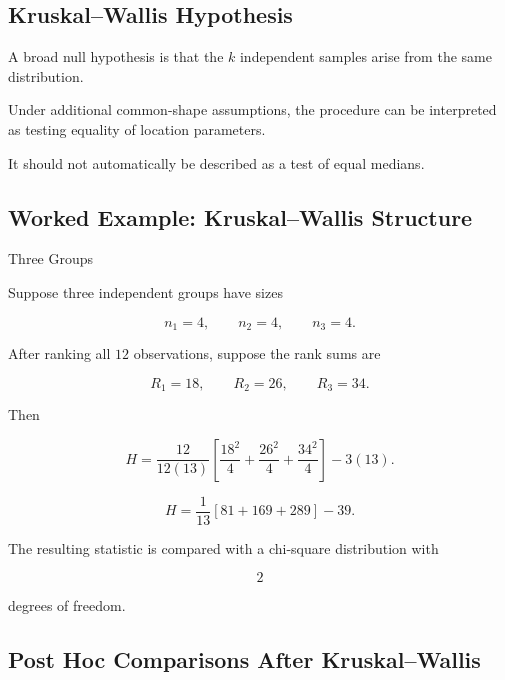 \subsection{Kruskal--Wallis Hypothesis}
\label{subsec:kruskal-wallis-hypothesis}

A broad null hypothesis is that the \(k\) independent samples arise from
the same distribution.

Under additional common-shape assumptions, the procedure can be
interpreted as testing equality of location parameters.

It should not automatically be described as a test of equal medians.

\subsection{Worked Example: Kruskal--Wallis Structure}
\label{subsec:worked-kruskal-wallis}

\begin{workedexamplebox}{Three Groups}

Suppose three independent groups have sizes

\[
n_1=4,
\qquad
n_2=4,
\qquad
n_3=4.
\]

After ranking all \(12\) observations, suppose the rank sums are

\[
R_1=18,
\qquad
R_2=26,
\qquad
R_3=34.
\]

Then

\[
H
=
\frac{
12
}{
12(13)
}
\left[
\frac{18^2}{4}
+
\frac{26^2}{4}
+
\frac{34^2}{4}
\right]
-
3(13).
\]

\begin{answerbox}
\[
\boxed{
H
=
\frac1{13}
\left[
81+169+289
\right]
-
39.
}
\]
\end{answerbox}

The resulting statistic is compared with a chi-square distribution with

\[
\boxed{
2
}
\]

degrees of freedom.

\end{workedexamplebox}

\subsection{Post Hoc Comparisons After Kruskal--Wallis}
\label{subsec:posthoc-kruskal-wallis}

